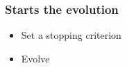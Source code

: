 \documentclass[18pt]{beamer}
\newcommand{\lstlistingwithnumber}[3]{
\begin{center}

\end{center}
}
\begin{document}
\begin{frame}
  \frametitle{Starts the evolution}
  \begin{itemize}
    \item Set a stopping criterion
    \lstlistingwithnumber{193}{196}{SingleLevelSetWhitaker.cxx}
    \item Evolve
    \lstlistingwithnumber{198}{204}{SingleLevelSetWhitaker.cxx}
    \lstlistingwithnumber{208}{208}{SingleLevelSetWhitaker.cxx}
  \end{itemize}
\end{frame}

% 


% 

% 

% 

% 

% 

% 

% 

% 

\end{document}
